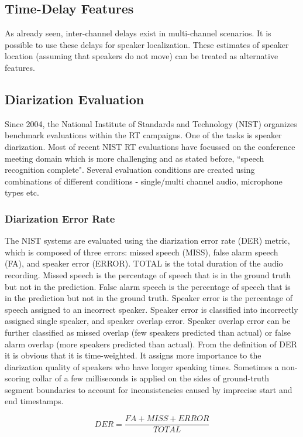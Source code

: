 	\subsection{Time-Delay Features}
	As already seen, inter-channel delays exist in multi-channel scenarios. It is possible to use these delays for speaker localization. These estimates of speaker location (assuming that speakers do not move) can be treated as alternative features.
	
	\subsection{Diarization Evaluation}
	Since 2004, the National Institute of Standards and Technology (NIST) organizes benchmark evaluations within the RT campaigns. One of the tasks is speaker diarization. Most of recent NIST RT evaluations have focussed on the conference meeting domain which is more challenging and as stated before, ``speech recognition complete". Several evaluation conditions are created using combinations of different conditions - single/multi channel audio, microphone types etc.
	
	\subsubsection{Diarization Error Rate}
		The NIST systems are evaluated using the diarization error rate (DER) metric, which is composed of three errors: missed speech (MISS), false alarm speech (FA), and speaker error (ERROR). TOTAL is the total duration of the audio recording. Missed speech is the percentage of speech that is in the ground truth but not in the prediction. False alarm speech is the percentage of speech that is in the prediction but not in the ground truth. Speaker error is the percentage of speech assigned to an incorrect speaker. Speaker error is classified into incorrectly assigned single speaker, and speaker overlap error. Speaker overlap error can be further classified as missed overlap (few speakers predicted than actual) or false alarm overlap (more speakers predicted than actual).
		From the definition of DER it is obvious that it is time-weighted. It assigns more importance to the diarization quality of speakers who have longer speaking times. Sometimes a non-scoring collar of a few milliseconds is applied on the sides of ground-truth segment boundaries to account for inconsistencies caused by imprecise start and end timestamps.
			
	$$ DER = \frac{FA + MISS + ERROR}{TOTAL} $$

